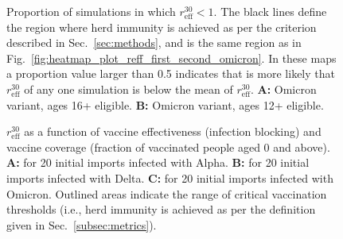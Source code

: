 \documentclass[article, a4, authoryear]{elsarticle}
\begin{document}
\begin{figure}[H]
    \centering
    \hfill
    
    \hfill
    \caption{Proportion of simulations in which $r_\mathrm{eff}^{30}<1$. The black lines define the region where herd immunity is achieved as per the criterion described in Sec.~\ref{sec:methods}, and is the same region as in Fig.~\ref{fig:heatmap_plot_reff_first_second_omicron}. In these maps a proportion value larger than 0.5 indicates that is more likely that $r_\mathrm{eff}^{30}$ of any one simulation is below the mean of $r_\mathrm{eff}^{30}$. \textbf{A:} Omicron variant, ages 16+ eligible. \textbf{B:} Omicron variant, ages 12+ eligible.}
    \label{sfig:heatmap_plot_reff_first_second_proportions_omicron}
\end{figure}


\begin{figure}[H]
    \centering
    \hfill
    \hfill
    \hfill
    \caption{$r_\mathrm{eff}^{30}$ as a function of vaccine effectiveness (infection blocking) and vaccine coverage (fraction of vaccinated people aged 0 and above). \textbf{A:} for 20 initial imports infected with Alpha. \textbf{B:} for 20 initial imports infected with Delta.
    \textbf{C:} for 20 initial imports infected with Omicron. Outlined areas indicate the range of critical vaccination thresholds (i.e., herd immunity is achieved as per the definition given in Sec.~\ref{subsec:metrics}).} 
    \label{sup:fig:heatmap_plot_reff}
\end{figure}
\end{document}
